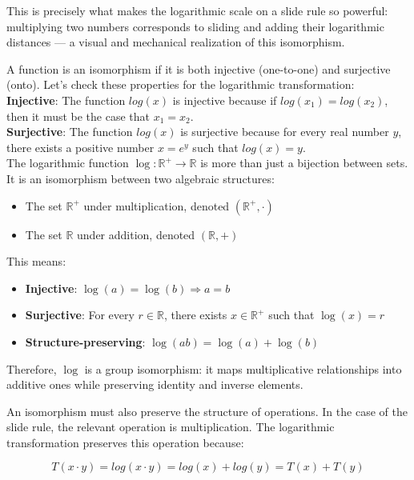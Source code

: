 \documentclass[10pt,twocolumn]{article}
\begin{document}
This is precisely what makes the logarithmic scale on a slide rule so powerful: multiplying two numbers corresponds to sliding and adding their logarithmic distances — a visual and mechanical realization of this isomorphism.

A function is an isomorphism if it is both injective (one-to-one) and surjective (onto). Let's check these properties for the logarithmic transformation:\\

\textbf{Injective}: The function \( log(x) \) is injective because if \( log(x_1) = log(x_2) \), then it must be the case that \( x_1 = x_2 \).\\

\textbf{Surjective}: The function \( log(x) \) is surjective because for every real number \( y \), there exists a positive number \( x = e^y \) such that \( log(x) = y \).\\

The logarithmic function \( \log: \mathbb{R}^+ \to \mathbb{R} \) is more than just a bijection between sets. It is an isomorphism between two algebraic structures:

\begin{itemize}
    \item The set \( \mathbb{R}^+ \) under multiplication, denoted \( (\mathbb{R}^+, \cdot) \)
    \item The set \( \mathbb{R} \) under addition, denoted \( (\mathbb{R}, +) \)
\end{itemize}

This means:
\begin{itemize}
    \item \textbf{Injective}: \( \log(a) = \log(b) \Rightarrow a = b \)
    \item \textbf{Surjective}: For every \( r \in \mathbb{R} \), there exists \( x \in \mathbb{R}^+ \) such that \( \log(x) = r \)
    \item \textbf{Structure-preserving}: \( \log(ab) = \log(a) + \log(b) \)
\end{itemize}

Therefore, \( \log \) is a group isomorphism: it maps multiplicative relationships into additive ones while preserving identity and inverse elements.

An isomorphism must also preserve the structure of operations. In the case of the slide rule, the relevant operation is multiplication. The logarithmic transformation preserves this operation because:

\[
T(x \cdot y) = log(x \cdot y) = log(x) + log(y) = T(x) + T(y)
\]
\end{document}
